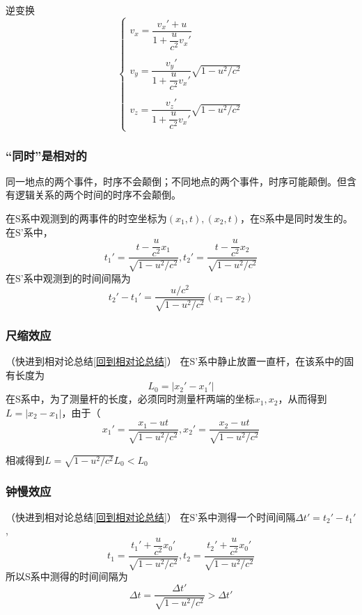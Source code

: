 逆变换
\begin{equation}
    \begin{cases}
        v_x=\dfrac{v_x' + u}{1+\dfrac{u}{c^2}v_x'}\\
        \\
        v_y=\dfrac{v_y'}{1+\dfrac{u}{c^2}v_x'}\sqrt{1-u^2/c^2}\\
        \\
        v_z=\dfrac{v_z'}{1+\dfrac{u}{c^2}v_x'}\sqrt{1-u^2/c^2}
    \end{cases}
\end{equation}
\subsubsection{“同时”是相对的}
同一地点的两个事件，时序不会颠倒；不同地点的两个事件，时序可能颠倒。但含有逻辑关系的两个时间的时序不会颠倒。

在S系中观测到的两事件的时空坐标为$(x_1,t),(x_2,t)$，在S系中是同时发生的。在S'系中，
\begin{equation}
    t_1'=\dfrac{t-\dfrac{u}{c^2}x_1}{\sqrt{1-u^2/c^2}},t_2'=\dfrac{t-\dfrac{u}{c^2}x_2}{\sqrt{1-u^2/c^2}}
\end{equation}
在S'系中观测到的时间间隔为
\begin{equation}
    t_2'-t_1'=\dfrac{u/c^2}{\sqrt{1-u^2/c^2}}(x_1-x_2)
\end{equation}
\subsubsection{尺缩效应}
（快进到相对论总结\ref{回到相对论总结}）
在S'系中静止放置一直杆，在该系中的固有长度为
\begin{equation}
    L_0=|x_2'-x_1'|
\end{equation}
在S系中，为了测量杆的长度，必须同时测量杆两端的坐标$x_1,x_2$，从而得到$L=|x_2-x_1|$，由于（
\begin{equation}\label{尺缩效应}
    x_1'=\dfrac{x_1-ut}{\sqrt{1-u^2/c^2}},x_2'=\dfrac{x_2-ut}{\sqrt{1-u^2/c^2}}
\end{equation}

相减得到$L=\sqrt{1-u^2/c^2} L_0<L_0$
\subsubsection{钟慢效应}
（快进到相对论总结\ref{回到相对论总结}）
在S'系中测得一个时间间隔$\Delta t'=t_2'-t_1'$,
\begin{equation}
    t_1=\dfrac{t_1'+\dfrac{u}{c^2}x_0'}{\sqrt{1-u^2/c^2}},t_2=\dfrac{t_2'+\dfrac{u}{c^2}x_0'}{\sqrt{1-u^2/c^2}}
\end{equation}
所以S系中测得的时间间隔为
\begin{equation}\label{钟慢效应}
    \Delta t= \dfrac{\Delta t'}{\sqrt{1-u^2/c^2}}>\Delta t'
\end{equation}
